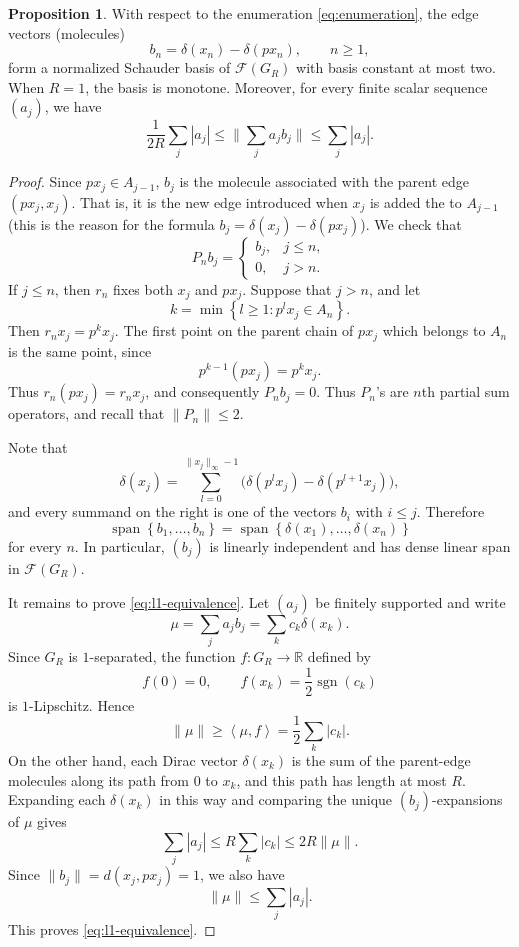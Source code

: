 \documentclass[11pt]{amsart}
\theoremstyle{definition}
\newtheorem{proposition}[theorem]{Proposition}
\newcommand{\F}{\mathcal F}
\newcommand{\sgn}{\operatorname{sgn}}
\newcommand{\norm}[1]{\lVert#1\rVert}
\newcommand{\abs}[1]{\left\lvert#1\right\rvert}
\newcommand{\set}[1]{\left\{#1\right\}}
\newcommand{\angles}[1]{\left\langle#1\right\rangle}
\def\R{{\mathbb R}}
\begin{document}
\begin{proposition}\label{prop:parent-edge-basis}
With respect to the enumeration \eqref{eq:enumeration}, the edge vectors (molecules)
$$
b_n=\delta(x_n)-\delta(px_n),
\qquad n\geq1,
$$
form a normalized Schauder basis of $\F(G_R)$ with basis constant at most two.  When $R=1$,
the basis is monotone.  Moreover, for every finite scalar sequence
$(a_j)$, we have
\begin{equation}\label{eq:l1-equivalence}
\frac{1}{2R}\sum_j\abs{a_j}
\leq\Big\|\sum_j a_jb_j\Big\|
\leq\sum_j\abs{a_j}.
\end{equation}
\end{proposition}


\begin{proof}
Since $px_j\in A_{j-1}$, $b_j$ is the molecule associated with the parent edge $(px_j, x_j)$. That is, it is the new edge introduced when $x_j$ is added the to $A_{j-1}$ (this is the reason for the formula $b_j=\delta(x_j)-\delta(px_j)$). We check that 
$$
P_nb_j=
\begin{cases}
b_j,&j\leq n,\\
0,&j>n.
\end{cases}
$$
If $j\leq n$, then $r_n$ fixes both $x_j$ and $px_j$.  Suppose that $j>n$,
and let
$$
k=\min\set{l\geq1:p^lx_j\in A_n}.
$$
Then $r_nx_j=p^kx_j$.  The first point on the parent chain of $px_j$ which
belongs to $A_n$ is the same point, since
$$
p^{k-1}(px_j)=p^kx_j.
$$
Thus $r_n(px_j)=r_nx_j$, and consequently $P_nb_j=0$. Thus $P_n$'s are $n$th partial sum operators, and recall that $\norm{P_n}\le 2$.

Note that
$$
\delta(x_j)=\sum_{l=0}^{\norm{x_j}_\infty-1}
\bigl(\delta(p^lx_j)-\delta(p^{l+1}x_j)\bigr),
$$
and every summand on the right is one of the vectors $b_i$ with $i\leq j$.
Therefore
$$
\operatorname{span}\set{b_1,\ldots,b_n}
=\operatorname{span}\set{\delta(x_1),\ldots,\delta(x_n)}
$$
for every $n$.  In particular, $(b_j)$ is linearly independent and has dense
linear span in $\F(G_R)$.

It remains to prove \eqref{eq:l1-equivalence}.  Let $(a_j)$ be finitely
supported and write
$$
\mu=\sum_j a_jb_j=\sum_k c_k\delta(x_k).
$$
Since $G_R$ is $1$-separated, the function $f:G_R\to\R$ defined by
$$
f(0)=0,
\qquad
f(x_k)=\frac12\sgn(c_k)
$$
is $1$-Lipschitz.  Hence
$$
\norm{\mu}\geq\angles{\mu,f}=\frac12\sum_k\abs{c_k}.
$$
On the other hand, each Dirac vector $\delta(x_k)$ is the sum of the
parent-edge molecules along its path from $0$ to $x_k$, and this path has
length at most $R$.  Expanding each $\delta(x_k)$ in this way and comparing
the unique $(b_j)$-expansions of $\mu$ gives
$$
\sum_j\abs{a_j}\leq R\sum_k\abs{c_k}\leq2R\norm{\mu}.
$$
Since $\norm{b_j}=d(x_j,px_j)=1$, we also have
$$
\norm{\mu}\leq\sum_j\abs{a_j}.
$$
This proves \eqref{eq:l1-equivalence}.

\end{proof}
\end{document}
